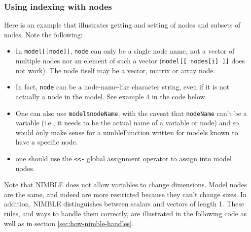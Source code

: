 \documentclass[12pt,oneside]{book}\usepackage[]{graphicx}\usepackage[]{color}
\def\cd#1{\texttt{#1}}
\begin{document}
\subsubsection{Using indexing with nodes}
  

Here is an example that illustrates getting and setting of nodes and subsets of nodes.  Note the following:

\begin{itemize}
  \item In \cd{model[[node]]}, \cd{node} can only be a single node name, not a vector of multiple nodes nor an element of such a vector (\cd{model[[ nodes[i] ]]} does not work).  The node itself may be a vector, matrix or array node.
  \item In fact, \cd{node} can be a node-name-like character string, even if it is not actually a node in the model.  See example 4 in the code below.
  \item One can also use \cd{model\$nodeName}, with the caveat that \cd{nodeName} can't be a variable (i.e., it needs to be the actual name of a variable or node) and so would only make sense for a nimbleFunction written for models known to have a specific node.
 \item one should use the \cd{<<-} global assignment operator to assign into model nodes. 
\end{itemize}

Note that NIMBLE does not allow variables to change dimensions.  Model nodes are the same, and indeed are more restricted because they can't change sizes.  In addition, NIMBLE distinguishes between scalars and vectors of length 1.  These rules, and ways to handle them correctly, are illustrated in the following code as well as in section \ref{sec:how-nimble-handles}.
\end{document}
